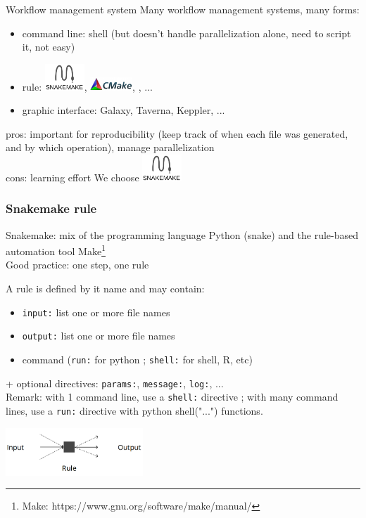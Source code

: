 \begin{frame}{Workflow management system}
Many workflow management systems, many forms:
\begin{itemize}
    \item command line: shell (but doesn't handle parallelization alone, need to script it, not easy)
    \item rule: \includegraphics[height=1cm]{shared/logo-snakemake.png}, \includegraphics[height=0.5cm]{shared/logo-cmake.png}, \logoNextflow, ...
    \item graphic interface: Galaxy, Taverna, Keppler, ...
\end{itemize}
\vfill
pros: important for reproducibility (keep track of when each file was generated, and by which operation), manage parallelization\\
cons: learning effort
\vfill
We choose \includegraphics[height=1cm]{shared/logo-snakemake.png}
\end{frame}
\begin{frame}[containsverbatim]
\frametitle{Snakemake rule}
Snakemake: mix of the programming language Python (snake) and the rule-based automation tool Make\footnote{Make: https://www.gnu.org/software/make/manual/}\\
Good practice: one step, one rule
\begin{block}{A rule is defined by it name and may contain:}
\begin{itemize}
    \item \verb|input:| list one or more file names
    \item \verb|output:| list one or more file names
    \item command (\verb|run:| for python ; \verb|shell:| for shell, R, etc)
\end{itemize}
+ optional directives: \verb|params:|, \verb|message:|, \verb|log:|, ...\\
Remark: with 1 command line, use a \verb|shell:| directive ; with many command lines, use a \verb|run:| directive with python shell("...") functions.
\end{block}
\begin{center}
    \includegraphics[height=1.8cm]{03_workflow/images/FAIR_WF_rule_concept_en.png}
\end{center}
\end{frame}
